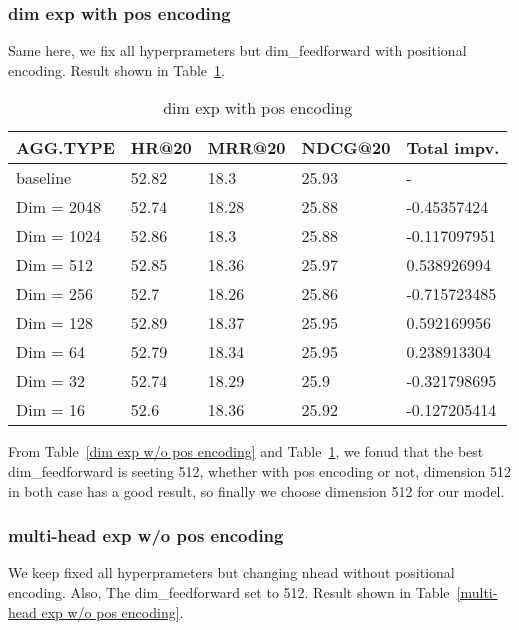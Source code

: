 \documentclass{article}
\begin{document}
\subsubsection{dim exp with pos encoding}

Same here, we fix all hyperprameters but dim\_feedforward with
positional encoding. Result shown in Table~\ref{dim exp with pos encoding}.

\begin{table}
    \caption{dim exp with pos encoding}
    \label{dim exp with pos encoding}
    \centering
    \begin{tabular}{lllll}
        \toprule
        AGG.TYPE   & HR@20 & MRR@20 & NDCG@20 & Total impv.  \\
        \midrule
        baseline   & 52.82 & 18.3   & 25.93   & -            \\
        Dim = 2048 & 52.74 & 18.28  & 25.88   & -0.45357424  \\
        Dim = 1024 & 52.86 & 18.3   & 25.88   & -0.117097951 \\
        Dim = 512  & 52.85 & 18.36  & 25.97   & 0.538926994  \\
        Dim = 256  & 52.7  & 18.26  & 25.86   & -0.715723485 \\
        Dim = 128  & 52.89 & 18.37  & 25.95   & 0.592169956  \\
        Dim = 64   & 52.79 & 18.34  & 25.95   & 0.238913304  \\
        Dim = 32   & 52.74 & 18.29  & 25.9    & -0.321798695 \\
        Dim = 16   & 52.6  & 18.36  & 25.92   & -0.127205414 \\
        \bottomrule
    \end{tabular}
\end{table}

From Table~\ref{dim exp w/o pos encoding} and Table~\ref{dim exp with pos encoding},
we fonud that the best dim\_feedforward is seeting 512,
whether with pos encoding or not, dimension 512 in both case has a good result,
so finally we choose dimension 512 for our model.

\subsubsection{multi-head exp w/o pos encoding}

We keep fixed all hyperprameters but changing nhead without positional encoding. Also, The dim\_feedforward set to 512. Result shown in Table~\ref{multi-head exp w/o pos encoding}.
\end{document}
